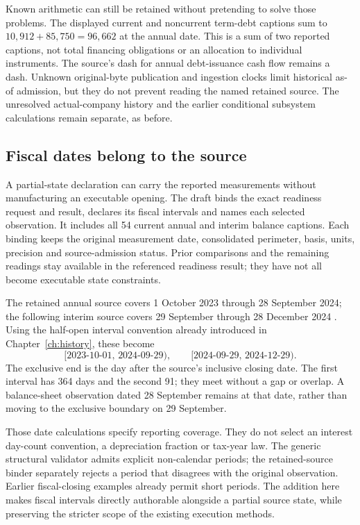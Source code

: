 Known arithmetic can still be retained without pretending to solve those
problems. The displayed current and noncurrent term-debt captions sum to
\(10{,}912+85{,}750=96{,}662\) at the annual date. This is a sum of two
reported captions, not total financing obligations or an allocation to
individual instruments. The source's dash for annual debt-issuance cash
flow remains a dash. Unknown original-byte publication and ingestion clocks
limit historical as-of admission, but they do not prevent reading the
named retained source. The unresolved actual-company history and the earlier
conditional subsystem calculations remain separate, as before.

\subsection{Fiscal dates belong to the source}

A partial-state declaration can carry the reported measurements without
manufacturing an executable opening. The draft
 binds the exact readiness request
and result, declares its fiscal intervals and names each selected observation.
It includes all 54 current annual and interim balance captions. Each binding
keeps the original measurement date, consolidated perimeter, basis, units,
precision and source-admission status. Prior comparisons and the remaining
readings stay available in the referenced readiness result; they have not
all become executable state constraints.

The retained annual source covers 1 October 2023 through 28 September 2024;
the following interim source covers 29 September through 28 December 2024
\citep{apple2024,apple2025q1}. Using the half-open interval convention already
introduced in Chapter~\ref{ch:history}, these become
\begin{equation}
\label{eq:source-fiscal-periods}
  [2023\text{-}10\text{-}01,\,2024\text{-}09\text{-}29),
  \qquad
  [2024\text{-}09\text{-}29,\,2024\text{-}12\text{-}29).
\end{equation}
The exclusive end is the day after the source's inclusive closing date.
The first interval has 364 days and the second 91; they meet without a
gap or overlap. A balance-sheet observation dated 28 September remains at
that date, rather than moving to the exclusive boundary on 29 September.

Those date calculations specify reporting coverage. They do not select an
interest day-count convention, a depreciation fraction or tax-year law.
The generic structural validator admits explicit non-calendar periods;
the retained-source binder separately rejects a period that disagrees with
the original observation. Earlier fiscal-closing examples already permit
short periods. The addition here makes fiscal intervals directly authorable
alongside a partial source state, while preserving the stricter scope of
the existing execution methods.

